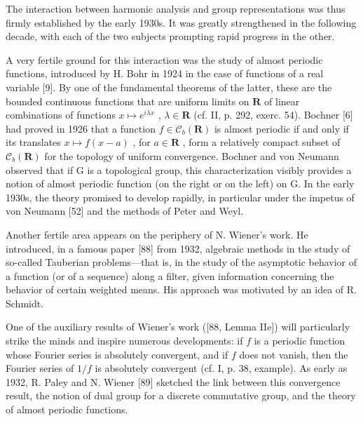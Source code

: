 
The interaction between harmonic analysis and group representations was thus firmly established by the early 1930s. It was greatly strengthened in the following decade, with each of the two subjects prompting rapid progress in the other.

A very fertile ground for this interaction was the study of almost periodic functions, introduced by H. Bohr in 1924 in the case of functions of a real variable {[}9{]}. By one of the fundamental theorems of the latter, these are the bounded continuous functions that are uniform limits on \(\mathbf{R}\) of linear combinations of functions \(x \mapsto e^{i\lambda x}\) , \(\lambda \in \mathbf{R}\) (cf. II, p. 292, exerc. 54). Bochner {[}6{]} had proved in 1926 that a function \(f \in \mathcal{C}_b(\mathbf{R})\) is almost periodic if and only if its translates \(x \mapsto f(x - a)\) , for \(a \in \mathbf{R}\) , form a relatively compact subset of \(\mathcal{C}_b(\mathbf{R})\) for the topology of uniform convergence. Bochner and von Neumann observed that if G is a topological group, this characterization visibly provides a notion of almost periodic function (on the right or on the left) on G. In the early 1930s, the theory promised to develop rapidly, in particular under the impetus of von Neumann {[}52{]} and the methods of Peter and Weyl.

Another fertile area appears on the periphery of N. Wiener's work. He introduced, in a famous paper {[}88{]} from 1932, algebraic methods in the study of so-called Tauberian problems—that is, in the study of the asymptotic behavior of a function (or of a sequence) along a filter, given information concerning the behavior of certain weighted means. His approach was motivated by an idea of R. Schmidt.

One of the auxiliary results of Wiener's work ({[}88, Lemma IIe{]}) will particularly strike the minds and inspire numerous developments: if \(f\) is a periodic function whose Fourier series is absolutely convergent, and if \(f\) does not vanish, then the Fourier series of \(1/f\) is absolutely convergent (cf. I, p. 38, example). As early as 1932, R. Paley and N. Wiener {[}89{]} sketched the link between this convergence result, the notion of dual group for a discrete commutative group, and the theory of almost periodic functions.

